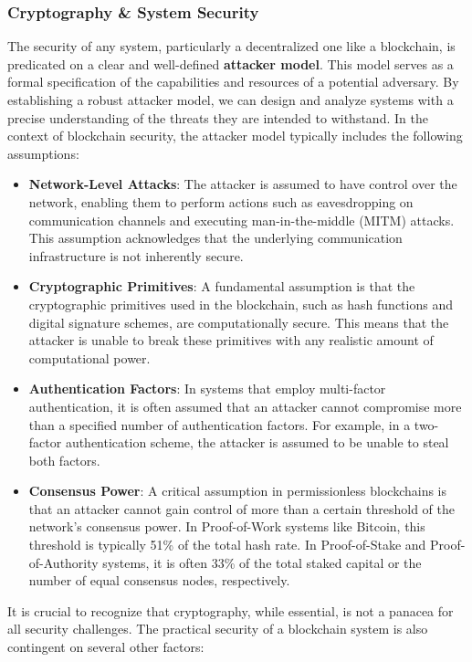\subsubsection{Cryptography \& System
	Security}\label{cryptography-system-security}

The security of any system, particularly a decentralized one like a
blockchain, is predicated on a clear and well-defined \textbf{attacker
	model}. This model serves as a formal specification of the capabilities
and resources of a potential adversary. By establishing a robust
attacker model, we can design and analyze systems with a precise
understanding of the threats they are intended to withstand. In the
context of blockchain security, the attacker model typically includes
the following assumptions:

\begin{itemize}
	\tightlist
	\item
	\textbf{Network-Level Attacks}: The attacker is assumed to have
	control over the network, enabling them to perform actions such as
	eavesdropping on communication channels and executing
	man-in-the-middle (MITM) attacks. This assumption acknowledges that
	the underlying communication infrastructure is not inherently secure.
	\item
	\textbf{Cryptographic Primitives}: A fundamental assumption is that
	the cryptographic primitives used in the blockchain, such as hash
	functions and digital signature schemes, are computationally secure.
	This means that the attacker is unable to break these primitives with
	any realistic amount of computational power.
	\item
	\textbf{Authentication Factors}: In systems that employ multi-factor
	authentication, it is often assumed that an attacker cannot compromise
	more than a specified number of authentication factors. For example,
	in a two-factor authentication scheme, the attacker is assumed to be
	unable to steal both factors.
	\item
	\textbf{Consensus Power}: A critical assumption in permissionless
	blockchains is that an attacker cannot gain control of more than a
	certain threshold of the network's consensus power. In Proof-of-Work
	systems like Bitcoin, this threshold is typically 51\% of the total
	hash rate. In Proof-of-Stake and Proof-of-Authority systems, it is often 33\% of the total
	staked capital or the number of equal consensus nodes, respectively.
\end{itemize}

It is crucial to recognize that cryptography, while essential, is not a
panacea for all security challenges. The practical security of a
blockchain system is also contingent on several other factors:

